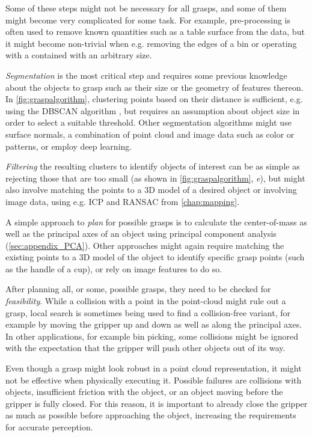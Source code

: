 Some of these steps might not be necessary for all grasps, and some of them might become very complicated for some task. For example, pre-processing is often used to remove known quantities such as a table surface from the data, but it might become non-trivial when e.g. removing the edges of a bin or operating with a contained with an arbitrary size.

\textsl{Segmentation} is the most critical step and requires some previous knowledge about the objects to grasp such as their size or the geometry of features thereon. In \cref{fig:graspalgorithm}, clustering points based on their distance is sufficient, e.g. using the DBSCAN algorithm \cite{ester1996density}, but requires an assumption about object size in order to select a suitable threshold. Other segmentation algorithms might use surface normals, a combination of point cloud and image data such as color or patterns, or employ deep learning.

\textsl{Filtering} the resulting clusters to identify objects of interest can be as simple as rejecting those that are too small (as shown in \cref{fig:graspalgorithm}, \textsl{e}), but might also involve matching the points to a 3D model of a desired object or involving image data, using e.g. ICP and RANSAC from \cref{chap:mapping}.

A simple approach to \textsl{plan} for possible grasps is to calculate the center-of-mass as well as the principal axes of an object using principal component analysis (\cref{sec:appendix_PCA}). Other approaches might again require matching the existing points to a 3D model of the object to identify specific grasp points (such as the handle of a cup), or rely on image features to do so.

After planning all, or some, possible grasps, they need to be checked for \textsl{feasibility}. While a collision with a point in the point-cloud might rule out a grasp, local search is sometimes being used to find a collision-free variant, for example by moving the gripper up and down as well as along the principal axes. In other applications, for example bin picking, some collisions might be ignored with the expectation that the gripper will push other objects out of its way.

Even though a grasp might look robust in a point cloud representation, it might not be effective when physically executing it. Possible failures are collisions with objects, insufficient friction with the object, or an object moving before the gripper is fully closed. For this reason, it is important to already close the gripper as much as possible before approaching the object, increasing the requirements for accurate perception.

